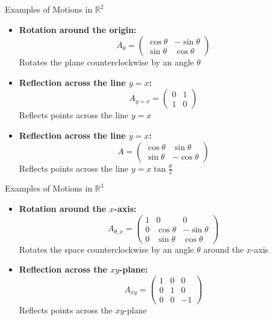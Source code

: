 \documentclass[fullscreen=true, bookmarks=true, hyperref={pdfencoding=unicode}]{beamer}
\begin{document}
\begin{frame}{Examples of Motions in $\mathbb{R}^2$}
  \begin{itemize}
    \item \textbf{Rotation around the origin:}
      \[
      A_\theta = \begin{pmatrix} \cos\theta & -\sin\theta \\ \sin\theta & \cos\theta \end{pmatrix}
      \]
      Rotates the plane counterclockwise by an angle $\theta$
    
    \pause\item \textbf{Reflection across the line $y = x$:}
      \[
      A_{y=x} = \begin{pmatrix} 0 & 1 \\ 1 & 0 \end{pmatrix}
      \]
      Reflects points across the line $y = x$

    \pause\item \textbf{Reflection across the line $y = x$:}
      \[
        A = \begin{pmatrix} \cos\theta & \sin\theta \\ \sin\theta & -\cos\theta \end{pmatrix}
      \]
      Reflects points across the line $y = x\tan \frac{\theta}{2} $
    \end{itemize}
\end{frame}


\begin{frame}{Examples of Motions in $\mathbb{R}^3$}
  \begin{itemize}
    \item \textbf{Rotation around the $x$-axis:}
      \[
      A_{\theta,x} = \begin{pmatrix} 1 & 0 & 0 \\ 0 & \cos\theta & -\sin\theta \\ 0 & \sin\theta & \cos\theta \end{pmatrix}
      \]
      Rotates the space counterclockwise by an angle $\theta$ around the $x$-axis
    
    \pause
    \item \textbf{Reflection across the $xy$-plane:}
      \[
      A_{xy} = \begin{pmatrix} 1 & 0 & 0 \\ 0 & 1 & 0 \\ 0 & 0 & -1 \end{pmatrix}
      \]
      Reflects points across the $xy$-plane
  \end{itemize}
\end{frame}
\end{document}
